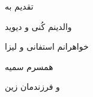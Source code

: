 \begin{center}
تقدیم به

 والدینم کُنی و دیوید

خواهرانم استفانی و لیزا

همسرم سمیه

و فرزندمان زین
\end{center}
